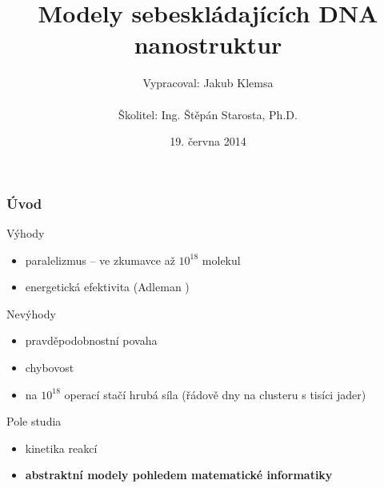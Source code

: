 \documentclass[10pt]{beamer}
\title{Modely sebeskládajících DNA nanostruktur}
\institute
{
	Fakulta jaderná a fyzikálně inženýrská\\
	Matematická informatika
}
\author{Vypracoval: Jakub Klemsa\\
	~\\
	Školitel: Ing. Štěpán Starosta, Ph.D.}
\date{19. června 2014}
\newcommand{\NP}{\mathsf{NP}}
\theoremstyle{definition}
\theoremstyle{remark}
\begin{document}
\begin{frame}
	\titlepage
\end{frame}

\begin{frame}
	\tableofcontents
\end{frame}



\begin{frame}
\frametitle{Úvod}
	Výhody
	\begin{itemize}
		\item paralelizmus -- ve zkumavce až $10^{18}$  molekul
		\item energetická efektivita (Adleman \cite{adleman94})
	\end{itemize}
	\pause
	Nevýhody
	\begin{itemize}
		\item pravděpodobnostní povaha
		\item chybovost
		\item na $10^{18}$ operací stačí hrubá síla (řádově dny na clusteru s tisíci jader)
	\end{itemize}
	\pause
	Pole studia
	\begin{itemize}
		\item kinetika reakcí
		\item {\bf abstraktní modely pohledem matematické informatiky}
	\end{itemize}
\end{frame}
\end{document}
